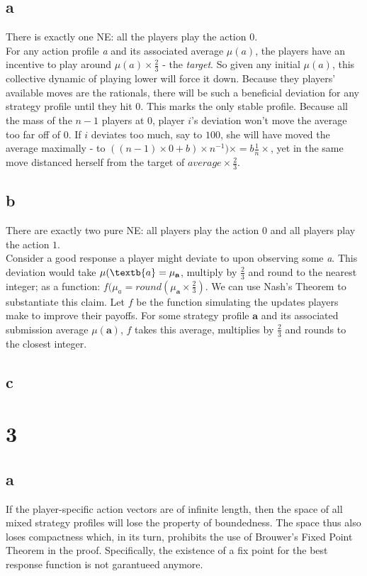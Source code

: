 \documentclass[10pt,a4paper]{article}
\begin{document}
\subsection*{a}
There is exactly one NE: all the players play the action $0$. \\
For any action profile \textit{a} and its associated average $\mu(\textit{a})$, the players have an incentive to play around $\mu(\textit{a})\times \tfrac{2}{3}$ - the \textit{target}. So given any initial $\mu(\textit{a})$, this collective dynamic of playing lower will force it down. Because they players' available moves are the rationals, there will be such a beneficial deviation for any strategy profile until they hit $0$. This marks the only stable profile. Because all the mass of the $n-1$ players at $0$, player $i$'s deviation won't move the average too far off of $0$. If $i$ deviates too much, say to $100$, she will have moved the average maximally - to $((n-1)\times 0 + b)\times n^{-1})\times=b \tfrac{1}{n}\times$, yet in the same move distanced herself from the target of $average \times \tfrac{2}{3}$.
\subsection*{b}
There are exactly two pure NE: all players play the action $0$ and all players play the action $1$.\\
Consider a good response a player might deviate to upon observing some \textit{a}. This deviation would take $\mu(\textb{a}=\mu_{\textbf{a}}$, multiply by $\tfrac{2}{3}$ and round to the nearest integer; as a function: $f(\mu_{\textit{a}}=round(\mu_{\textbf{a}}\times \tfrac{2}{3})$.
We can use Nash's Theorem to substantiate this claim. Let $f$ be the function simulating the updates players make to improve their payoffs. For some strategy profile $\textbf{a}$ and its associated submission average $\mu(\textbf{a})$, $f$ takes this average, multiplies by $\tfrac{2}{3}$ and rounds to the closest integer.
\subsection*{c}
\section*{3}
\subsection*{a}
If the player-specific action vectors are of infinite length, then the space of all mixed strategy profiles will lose the property of boundedness. The space thus also loses compactness which, in its turn, prohibits the use of Brouwer's Fixed Point Theorem in the proof. Specifically, the existence of a fix point for the best response function is not garantueed anymore.
\end{document}
